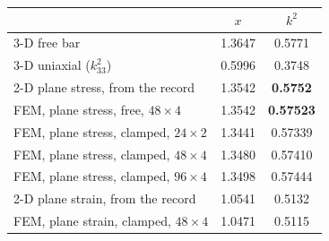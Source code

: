 \begin{tabular}{@{}lcc@{}}
\toprule
& $x$ & $k^2$ \\
\midrule
3-D free bar & 1.3647 & 0.5771 \\
3-D uniaxial ($k_{33}^2$) & 0.5996 & 0.3748 \\
2-D plane stress, from the record & 1.3542 & \textbf{0.5752} \\
\midrule
FEM, plane stress, free, $48\times4$ & 1.3542 & \textbf{0.57523} \\
FEM, plane stress, clamped, $24\times2$ & 1.3441 & 0.57339 \\
FEM, plane stress, clamped, $48\times4$ & 1.3480 & 0.57410 \\
FEM, plane stress, clamped, $96\times4$ & 1.3498 & 0.57444 \\
\midrule
2-D plane strain, from the record & 1.0541 & 0.5132 \\
FEM, plane strain, clamped, $48 \times 4$ & 1.0471 & 0.5115 \\
\bottomrule
\end{tabular}
